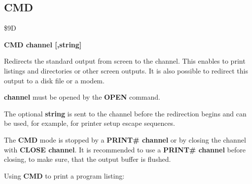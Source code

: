 
\newpage
\subsection{CMD}
\begin{description}[leftmargin=3cm,style=nextline]
\item [Token:] \$9D
\item [Format:] {\bf CMD channel [,string]}
\item [Usage:] Redirects the standard output
               from screen to the channel. This enables to
               print listings and directories or other screen outputs.
               It is also possible to redirect this output to a disk file
               or a modem.

               {\bf channel} must be opened by the {\bf OPEN} command.

               The optional {\bf string} is sent to the channel
               before the redirection begins and can be used,
               for example, for printer setup escape sequences.

\item [Remarks:] The {\bf CMD} mode is stopped by a {\bf PRINT\# channel}
                 or by closing the channel with {\bf CLOSE channel}.
                 It is recommended to use a {\bf PRINT\# channel}
                 before closing, to make sure, that the output buffer
                 is flushed.

\item [Example:] Using {\bf CMD} to print a program listing:
\end{description}


\newpage
